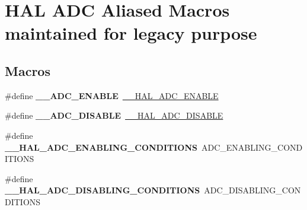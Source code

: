 \hypertarget{group___h_a_l___a_d_c___aliased___macros}{}\section{H\+AL A\+DC Aliased Macros maintained for legacy purpose}
\label{group___h_a_l___a_d_c___aliased___macros}
\subsection*{Macros}
\begin{DoxyCompactItemize}
\item 
\mbox{\label{group___h_a_l___a_d_c___aliased___macros_gade2e452da8695130dbc0b8b516ec16ff}} 
\#define {\bfseries \+\_\+\+\_\+\+A\+D\+C\+\_\+\+E\+N\+A\+B\+LE}~\mbox{\hyperlink{group___a_d_c___exported___macros_gaadf16862da7593def189559423c287f4}{\+\_\+\+\_\+\+H\+A\+L\+\_\+\+A\+D\+C\+\_\+\+E\+N\+A\+B\+LE}}
\item 
\mbox{\label{group___h_a_l___a_d_c___aliased___macros_ga6a8dfa9e047c1ac8f70d2fe3ae3fd4dc}} 
\#define {\bfseries \+\_\+\+\_\+\+A\+D\+C\+\_\+\+D\+I\+S\+A\+B\+LE}~\mbox{\hyperlink{group___a_d_c___exported___macros_ga8afd5963c41c0a30c5cf1fec5c5710b3}{\+\_\+\+\_\+\+H\+A\+L\+\_\+\+A\+D\+C\+\_\+\+D\+I\+S\+A\+B\+LE}}
\item 
\mbox{\label{group___h_a_l___a_d_c___aliased___macros_gaf09405aa65148ec822984b2d81992596}} 
\#define {\bfseries \+\_\+\+\_\+\+H\+A\+L\+\_\+\+A\+D\+C\+\_\+\+E\+N\+A\+B\+L\+I\+N\+G\+\_\+\+C\+O\+N\+D\+I\+T\+I\+O\+NS}~A\+D\+C\+\_\+\+E\+N\+A\+B\+L\+I\+N\+G\+\_\+\+C\+O\+N\+D\+I\+T\+I\+O\+NS
\item 
\mbox{\label{group___h_a_l___a_d_c___aliased___macros_ga758e02a9d4e37528e42ff60eff476cbf}} 
\#define {\bfseries \+\_\+\+\_\+\+H\+A\+L\+\_\+\+A\+D\+C\+\_\+\+D\+I\+S\+A\+B\+L\+I\+N\+G\+\_\+\+C\+O\+N\+D\+I\+T\+I\+O\+NS}~A\+D\+C\+\_\+\+D\+I\+S\+A\+B\+L\+I\+N\+G\+\_\+\+C\+O\+N\+D\+I\+T\+I\+O\+NS
\item 
\mbox{\label{group___h_a_l___a_d_c___aliased___macros_ga2c78554d5c9d8311297ea8fb01866309}} 

\end{DoxyCompactItemize}
